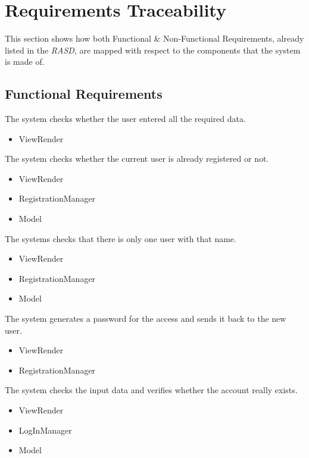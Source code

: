 \documentclass[11pt,a4paper]{report}
\begin{document}
\chapter{Requirements Traceability}
This section shows how both Functional \& Non-Functional Requirements, already listed in the \textit{RASD}, are mapped with respect to the components that the system is made of.
\section{Functional Requirements}
	\begin{Req}
		\item The system checks whether the user entered all the required data.
			\begin{itemize}
				\item ViewRender
			\end{itemize}
		\item The system checks whether the current user is already registered or not.
			\begin{itemize}
				\item ViewRender
				\item RegistrationManager
				\item Model
			\end{itemize}
		\item The systems checks that there is only one user with that name.
			\begin{itemize}
				\item ViewRender
				\item RegistrationManager
				\item Model
			\end{itemize}
		\item The system generates a password for the access and sends it back to the new user.
			\begin{itemize}
				\item ViewRender
				\item RegistrationManager
			\end{itemize}
		\item  The system checks the input data and verifies whether the account really exists.
			\begin{itemize}
				\item ViewRender
				\item LogInManager
				\item Model

\end{itemize}
\end{Req}
\end{document}
